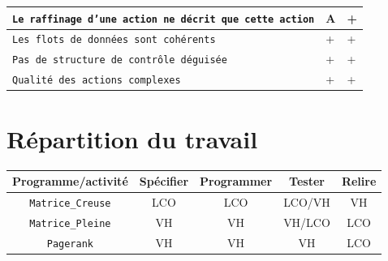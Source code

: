 \documentclass{article}
\begin{document}
\begin{center}
\begin{tabular}{|p{11cm}|p{1cm}|p{1cm}|}
        \hline
        \texttt{Le raffinage d'une action ne décrit que cette action}                                                                            & A   & +  \\
        \hline
        \texttt{Les flots de données sont cohérents}                                                                                             & +   & +  \\
        \hline
        \texttt{Pas de structure de contrôle déguisée}                                                                                           & +   & +  \\
        \hline
        \texttt{Qualité des actions complexes}                                                                                                   & +   & +  \\
        \hline
    \end{tabular}
\end{center}


\section{Répartition du travail}

\begin{center}
    \begin{tabular}{|c|c|c|c|c|}
        \hline
        Programme/activité       & Spécifier & Programmer & Tester & Relire \\
        \hline
        \texttt{Matrice\_Creuse} & LCO       & LCO        & LCO/VH & VH     \\
        \hline
        \texttt{Matrice\_Pleine} & VH        & VH         & VH/LCO & LCO    \\
        \hline
        \texttt{Pagerank}        & VH        & VH         & VH     & LCO    \\
        \hline
    \end{tabular}
\end{center}
\end{document}
